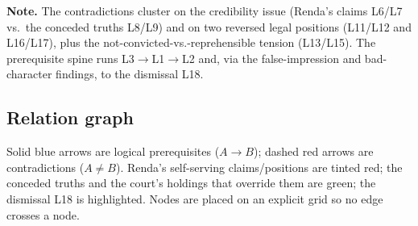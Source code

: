 \documentclass[11pt]{article}
\begin{document}
\noindent
\textbf{Note.} The contradictions cluster on the credibility issue (Renda's
claims L6/L7 vs.\ the conceded truths L8/L9) and on two reversed legal positions
(L11/L12 and L16/L17), plus the not-convicted-vs.-reprehensible tension
(L13/L15). The prerequisite spine runs L3$\to$L1$\to$L2 and, via the
false-impression and bad-character findings, to the dismissal L18.

\subsection*{Relation graph}

Solid blue arrows are logical prerequisites ($A \rightarrow B$); dashed red
arrows are contradictions ($A \neq B$). Renda's self-serving claims/positions are
tinted red; the conceded truths and the court's holdings that override them are
green; the dismissal L18 is highlighted. Nodes are placed on an explicit grid so
no edge crosses a node.
\end{document}
